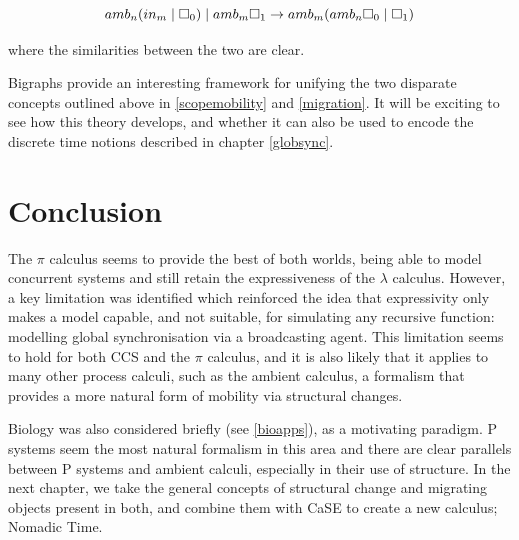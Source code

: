 \begin{equation}
amb_n (in_m \;|\; \square_0) \;|\; amb_m \square_1
\rightarrow
amb_m (amb_n \square_0 \;|\; \square_1)
\end{equation}

\noindent where the similarities between the two are clear.

Bigraphs provide an interesting framework for unifying the two
disparate concepts outlined above in \ref{scopemobility} and
\ref{migration}.  It will be exciting to see how this theory develops,
and whether it can also be used to encode the discrete time notions
described in chapter \ref{globsync}.

\section{Conclusion}

The $\pi$ calculus seems to provide the best of both worlds, being able
to model concurrent systems and still retain the expressiveness of the
$\lambda$ calculus.  However, a key limitation was identified which
reinforced the idea that expressivity only makes a model capable, and
not suitable, for simulating any recursive function: modelling global
synchronisation via a broadcasting agent.  This limitation seems to hold
for both CCS and the $\pi$ calculus, and it is also likely that it
applies to many other process calculi, such as the ambient calculus, a
formalism that provides a more natural form of mobility via structural
changes.

Biology was also considered briefly (see \ref{bioapps}), as a
motivating paradigm.  P systems seem the most natural formalism in
this area and there are clear parallels between P systems and ambient
calculi, especially in their use of structure.  In the next chapter,
we take the general concepts of structural change and migrating
objects present in both, and combine them with CaSE to create a new
calculus; Nomadic Time.
